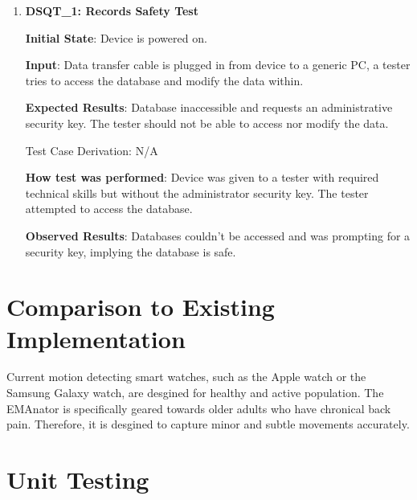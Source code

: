 \documentclass[12pt, titlepage]{article}
\begin{document}
\begin{enumerate}

  \item{\textbf{DSQT\_1: Records Safety Test}}\label{DSQT1}

  \textbf{Initial State}: Device is powered on.

  \textbf{Input}: Data transfer cable is plugged in from device to a generic PC, a tester tries to access the database and modify the data within.

  \textbf{Expected Results}: Database inaccessible and requests an administrative security key. The tester should not be able to access nor modify the data.

  Test Case Derivation: N/A

  \textbf{How test was performed}: Device was given to a tester with required technical skills but without the administrator security key. The tester attempted to access the database.

  \textbf{Observed Results}: Databases couldn't be accessed and was prompting for a security key, implying the database is safe.

\end{enumerate}


\section{Comparison to Existing Implementation}
Current motion detecting smart watches, such as the Apple watch or the Samsung Galaxy watch, are desgined for healthy and active population. The EMAnator is specifically geared towards older adults who have chronical back pain. Therefore, it is desgined to capture minor and subtle movements accurately.

\section{Unit Testing}
\end{document}
